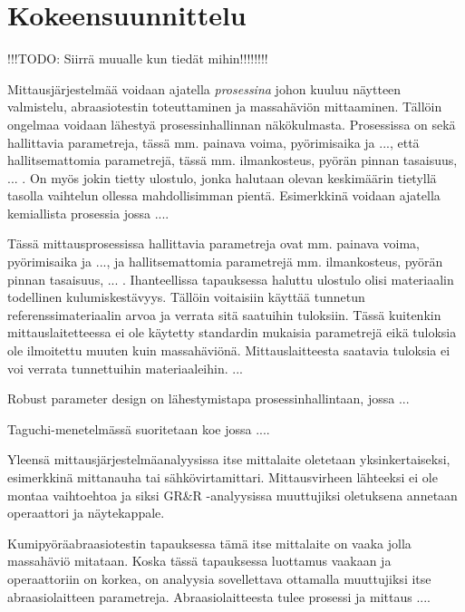 \documentclass[12pt,a4paper,finnish]{tutthesis}
\newcommand\todo[1]{{\color{red}!!!TODO: #1}} %
\begin{document}
\chapter{Kokeensuunnittelu}
\label{ch:doe}

\todo{Siirrä muualle kun tiedät mihin!!!!!!!!}

Mittausjärjestelmää voidaan ajatella \textit{prosessina} johon kuuluu
näytteen valmistelu, abraasiotestin toteuttaminen ja massahäviön
mittaaminen. Tällöin ongelmaa voidaan lähestyä prosessinhallinnan
näkökulmasta. Prosessissa on sekä hallittavia parametreja, tässä mm. painava
voima, pyörimisaika ja ..., että hallitsemattomia parametrejä, tässä mm.
ilmankosteus, pyörän pinnan tasaisuus, ... . On myös jokin tietty ulostulo,
jonka halutaan olevan keskimäärin tietyllä tasolla vaihtelun ollessa
mahdollisimman pientä. Esimerkkinä voidaan ajatella kemiallista prosessia
jossa ....

Tässä mittausprosessissa hallittavia parametreja ovat mm. painava
voima, pyörimisaika ja ..., ja hallitsemattomia parametrejä mm.
ilmankosteus, pyörän pinnan tasaisuus, ... . Ihanteellissa tapauksessa
haluttu ulostulo olisi materiaalin todellinen kulumiskestävyys.
Tällöin voitaisiin käyttää tunnetun referenssimateriaalin arvoa ja
verrata sitä saatuihin tuloksiin.
Tässä kuitenkin mittauslaitetteessa ei ole käytetty standardin mukaisia
parametrejä eikä tuloksia ole ilmoitettu muuten kuin massahäviönä.
Mittauslaitteesta saatavia tuloksia ei voi verrata tunnettuihin
materiaaleihin. ...

Robust parameter design on lähestymistapa prosessinhallintaan, jossa ...

Taguchi-menetelmässä suoritetaan koe jossa ....


Yleensä mittausjärjestelmäanalyysissa itse mittalaite oletetaan
yksinkertaiseksi, esimerkkinä mittanauha tai sähkövirtamittari.
Mittausvirheen lähteeksi ei ole montaa vaihtoehtoa ja siksi GR\&R -analyysissa
muuttujiksi oletuksena annetaan operaattori ja näytekappale.

Kumipyöräabraasiotestin tapauksessa tämä itse mittalaite on vaaka jolla
massahäviö mitataan. Koska tässä tapauksessa luottamus vaakaan ja operaattoriin
on korkea, on analyysia sovellettava ottamalla muuttujiksi itse
abraasiolaitteen parametreja. Abraasiolaitteesta tulee prosessi ja mittaus
....
\end{document}
